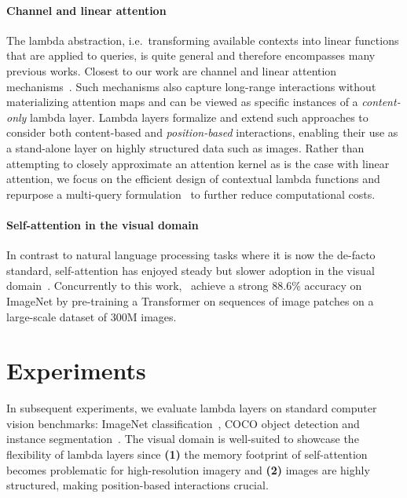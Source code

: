 \documentclass{article} \usepackage{iclr2021_conference,times}
\begin{document}
\paragraph{Channel and linear attention} The lambda abstraction, i.e.\ transforming available contexts into linear functions that are applied to queries, is quite general and therefore encompasses many previous works.
Closest to our work are channel and linear attention mechanisms~\citep{hu2017squeeze,katharopoulos2020transformers,choromanski2020rethinking}.
Such mechanisms also capture long-range interactions without materializing attention maps and can be viewed as specific instances of a \emph{content-only} lambda layer.
Lambda layers formalize and extend such approaches to consider both content-based and \emph{position-based} interactions, enabling their use as a stand-alone layer on highly structured data such as images.
Rather than attempting to closely approximate an attention kernel as is the case with linear attention, we focus on the efficient design of contextual lambda functions and repurpose a multi-query formulation~\citep{shazeer2019fast} to further reduce computational costs.

\vspace{-0.15cm}
\paragraph{Self-attention in the visual domain}
In contrast to natural language processing tasks where it is now the de-facto standard, self-attention has enjoyed steady but slower adoption in the visual domain~\citep{wang2018non,bello2019aacn,ramachandran2019sasa,carion2020endtoend}.
Concurrently to this work,~\cite{dosovitskiy2020image} achieve a strong 88.6\% accuracy on ImageNet by pre-training a Transformer on sequences of image patches on a large-scale dataset of 300M images. \section{Experiments\label{sec:experiments}}
In subsequent experiments, we evaluate lambda layers on standard computer vision benchmarks:
ImageNet classification~\citep{deng2009imagenet},
COCO object detection and instance segmentation~\citep{lin2014microsoft}.
The visual domain is well-suited to showcase the flexibility of lambda layers since
\textbf{(1)} the memory footprint of self-attention becomes problematic for high-resolution imagery and
\textbf{(2)} images are highly structured, making position-based interactions crucial.
\end{document}
